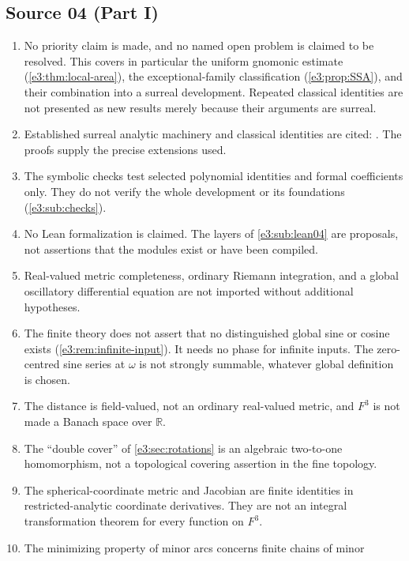 \documentclass[11pt,letterpaper]{article}
\numberwithin{equation}{section}
\theoremstyle{definition}
\theoremstyle{remark}
\newcommand{\R}{\mathbb R}
\begin{document}
\subsection{Source 04 (Part I)}\label{e3:sub:nonclaims04}
\begin{enumerate}[label=\textup{G\arabic*.},leftmargin=2.6em]
\item No priority claim is made, and no named open problem is claimed to be
 resolved. This covers in particular the uniform gnomonic estimate
 (\cref{e3:thm:local-area}), the exceptional-family classification
 (\cref{e3:prop:SSA}), and their combination into a surreal development.
 Repeated classical identities are not presented as new results merely
 because their arguments are surreal.
\item Established surreal analytic machinery and classical identities are
 cited: \cite{vdDE,vdDEErr,EK,Neumann,DLMF,Oosterom}. The proofs supply the
 precise extensions used.
\item The symbolic checks test selected polynomial identities and formal
 coefficients only. They do not verify the whole development or its
 foundations (\cref{e3:sub:checks}).
\item No Lean formalization is claimed. The layers of \cref{e3:sub:lean04} are
 proposals, not assertions that the modules exist or have been compiled.
\item Real-valued metric completeness, ordinary Riemann integration, and a
 global oscillatory differential equation are not imported without additional
 hypotheses.
\item The finite theory does not assert that no distinguished global sine or
 cosine exists (\cref{e3:rem:infinite-input}). It needs no phase for infinite
 inputs. The zero-centred sine series at $\omega$ is not strongly summable,
 whatever global definition is chosen.
\item The distance is field-valued, not an ordinary real-valued metric, and
 $F^3$ is not made a Banach space over $\R$.
\item The ``double cover'' of \cref{e3:sec:rotations} is an algebraic two-to-one
 homomorphism, not a topological covering assertion in the fine topology.
\item The spherical-coordinate metric and Jacobian are finite identities in
 restricted-analytic coordinate derivatives. They are not an integral
 transformation theorem for every function on $F^3$.
\item The minimizing property of minor arcs concerns finite chains of minor

\end{enumerate}
\end{document}
